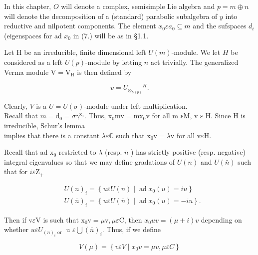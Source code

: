 \documentclass[10pt]{article}
\begin{document}
In this chapter, $O$ will denote a complex, semisimple Lie algebra and $p=m \oplus n$ will denote the decomposition of a (standard) parabolic subalgebra of $y$ into reductive and nilpotent components. The element $x_{0} \varepsilon a_{0} \subseteq m$ and the sufspaces $d_{i}$ (eigenspaces for ad $x_{0}$ in (7.) will be as in §1.1.

Let H be an irreducible, finite dimensional left $U(m)$-module. We let $H$ be considered as a left $U(p)$-module by letting $n$ act trivially. The generalized Verma module $\mathrm{V}=\mathrm{V}_{\mathrm{H}}$ is then defined by


\begin{equation*}
v=U_{\otimes_{U(p)}}{ }^{H} . \tag{5.1.1}
\end{equation*}


Clearly, $V$ is a $U=U(\sigma)$-module under left multiplication.\\
Recall that $m=\mathrm{d}_{0}=\sigma \gamma^{\mathrm{x}_{0}}$. Thus, $\mathrm{x}_{0} \mathrm{mv}=\mathrm{mx}_{0} \mathrm{v}$ for all m ɛM, v ɛ H. Since H is irreducible, Schur's lemma\\
implies that there is a constant $\lambda \varepsilon \mathbb{C}$ such that $\mathrm{x}_{0} \mathrm{v}=\lambda \mathrm{v}$ for all $\mathrm{v} \varepsilon \mathrm{H}$.

Recall that ad $\mathrm{x}_{0}$ restricted to $\lambda$ (resp. $\bar{n}$ ) has strictly positive (resp. negative) integral eigenvalues so that we may define gradations of $U(n)$ and $U(\bar{n})$ such that for $i \varepsilon \mathrm{Z}_{+}$


\begin{align*}
& U(n)_{i}=\left\{u \varepsilon U(n) \mid \operatorname{ad} x_{0}(u)=i u\right\}  \tag{5.1.2}\\
& U(\bar{n})_{i}=\left\{u \varepsilon U(\bar{n}) \mid \operatorname{ad} x_{0}(u)=-i u\right\} .
\end{align*}


Then if $\mathrm{v} \varepsilon \mathrm{V}$ is such that $\mathrm{x}_{0} \mathrm{v}=\mu \mathrm{v}, \mu \varepsilon \mathrm{C}$, then $x_{0} u v=(\mu+i) v$ depending on whether $u \varepsilon U_{(n)_{i} \text { or }}$ u $\varepsilon \bigcup(\bar{n})_{i}$. Thus, if we define


\begin{equation*}
V(\mu)=\left\{v \varepsilon V \mid x_{0} v=\mu v, \mu \varepsilon C\right\} \tag{5.1.3}
\end{equation*}
\end{document}
